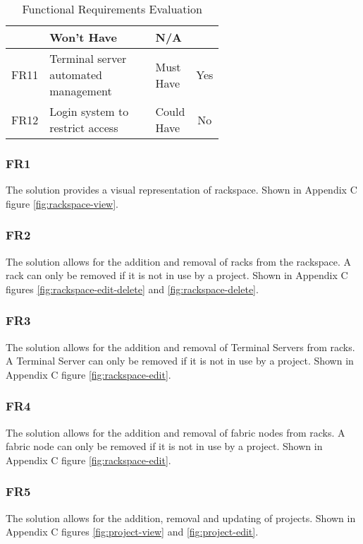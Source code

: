\begin{center}
\begin{table}[H]
\begin{tabular}{l p{0.6\linewidth} l c}
                        & Won’t Have
                        & \cellcolor{red!25}N/A
            \\
            \hline
            FR11        & Terminal server automated management
                        & Must Have
                        & \cellcolor{green!25}Yes
            \\ \hline
            FR12        & Login system to restrict access                   &
            Could Have
                        & \cellcolor{red!25}No
            \\
        \end{tabular}
        \caption{Functional Requirements Evaluation}
        \label{table:evaluation-functional-requirements}
    \end{table}
\end{center}

\subsubsection{FR1}
The solution provides a visual representation of rackspace. Shown in Appendix C figure \ref{fig:rackspace-view}.

\subsubsection{FR2}
The solution allows for the addition and removal of racks from the rackspace. A rack can only be removed if it is not in use by a project. Shown in Appendix C figures \ref{fig:rackspace-edit-delete} and \ref{fig:rackspace-delete}.

\subsubsection{FR3}
The solution allows for the addition and removal of Terminal Servers from racks. A Terminal Server can only be removed if it is not in use by a project. Shown in Appendix C figure \ref{fig:rackspace-edit}.

\subsubsection{FR4}
The solution allows for the addition and removal of fabric nodes from racks. A fabric node can only be removed if it is not in use by a project. Shown in Appendix C figure \ref{fig:rackspace-edit}.

\subsubsection{FR5}
The solution allows for the addition, removal and updating of projects. Shown in Appendix C figures \ref{fig:project-view} and \ref{fig:project-edit}.

